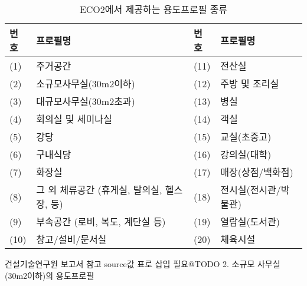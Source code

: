 \begin{table}[ht]
  \caption{ECO2에서 제공하는 용도프로필 종류}
  \label{tbl:eco2profiles}  
  \centering
  \begin{tabular}{llll}
    \toprule
    번호 & 프로필명 & 번호 & 프로필명 \\ \midrule
    (1) & 주거공간             & (11) & 전산실 \\ \midrule
    (2) & 소규모사무실(30m2이하) & (12) & 주방 및 조리실 \\ \midrule
    (3) & 대규모사무실(30m2초과) & (13) & 병실 \\ \midrule
    (4) & 회의실 및 세미나실     & (14) & 객실 \\ \midrule
    (5) & 강당                & (15) & 교실(초중고) \\ \midrule
    (6) & 구내식당             & (16) & 강의실(대학) \\ \midrule
    (7) & 화장실               & (17) & 매장(상점/백화점) \\ \midrule
    (8) & 그 외 체류공간 (휴게실, 탈의실, 헬스장, 등) & (18) & 전시실(전시관/박물관) \\ \midrule
    (9) & 부속공간 (로비, 복도, 계단실 등) & (19) & 열람실(도서관) \\ \midrule
    (10) & 창고/설비/문서실     & (20) & 체육시설 \\ \bottomrule
  \end{tabular}
\end{table}


건설기술연구원 보고서 참고 source값 표로 삽입 필요@TODO \cite{law:usageprofile}
2. 소규모 사무실(30m2이하)의 용도프로필

